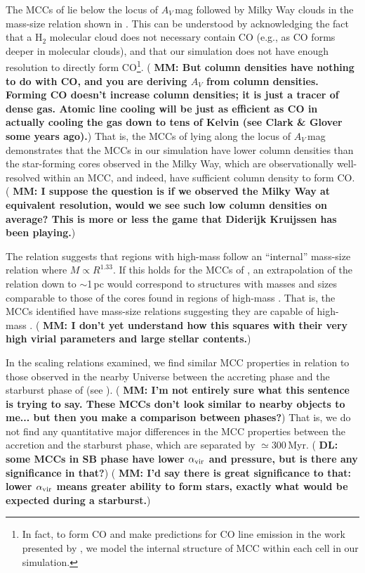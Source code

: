 \IfFileExists{emulateapjlegacy.cls}{\documentclass[iop]{emulateapjlegacy}}{\documentclass[iop]{emulateapj}}
\newcommand{\DL}[1]{({\bf \color{dlcolor} DL: #1})}
\newcommand{\MM}[1]{({\bf \color{mmcolor} MM: #1})}
\begin{document}
The MCCs of \flower lie below the locus of $A_V$\,mag followed
by Milky Way clouds in the mass-size relation shown in . This
can be understood by acknowledging the fact that a H$_2$ molecular
cloud does not necessary contain CO (e.g., as CO forms deeper in
molecular clouds), and that our simulation does not have enough
resolution to directly form CO\footnote{In fact, to form CO and make
  predictions for CO line emission in the work presented by
  \citet{Vallini18a}, we model the internal structure of MCC within
  each cell in our simulation.}.  
\MM{But column densities have nothing to do with CO, and you are
  deriving $A_V$ from column densities.  Forming CO doesn't increase
  column densities; it is just a tracer of dense gas.  Atomic line
  cooling will be just as efficient as CO in actually cooling the gas
  down to tens of Kelvin (see Clark \& Glover some years ago).}
%
That is, the MCCs of \flower lying along the locus of $A_V$\,mag 
    demonstrates
that the MCCs in our simulation have lower column densities than the
star-forming cores observed in the Milky Way, which are
observationally well-resolved within an MCC, and indeed, have
sufficient column density to form CO.  \MM{I suppose the question is
  if we observed the Milky Way at equivalent resolution, would we see
  such low column densities on average?  This is more or less the game
that Diderijk Kruijssen has been playing.}

The \citet{Kauffmann10c} relation suggests that regions with high-mass \SF follow 
an ``internal'' mass-size relation where $M\propto R^{1.33}$.
If this holds for the MCCs of \flower, an extrapolation of the \citet{Kauffmann10c} relation down to $\sim$1\,pc would correspond to structures with masses and sizes comparable to those of the cores found in
regions of high-mass \SF. That is, the MCCs identified have mass-size
relations suggesting they are capable of high-mass \SF. \MM{I don't
  yet understand how this squares with their very high virial
  parameters and large stellar contents.}

In the scaling relations examined, we find similar MCC properties in
relation to those observed in the nearby Universe between the
accreting phase and the starburst phase of \flower (see
). \MM{I'm not entirely sure what this sentence is
  trying to say.  These MCCs don't look similar to nearby objects to
  me... but then you make a comparison between phases?} That is, we do not find any quantitative major differences in the MCC properties between the accretion and the starburst phase, which are separated by $\simeq$300\,Myr. \DL{some MCCs in SB phase have
lower $\alpha_{\rm vir}$ and pressure, but 
is there any significance in that?} \MM{I'd say there is great
significance to that: lower $\alpha_{\rm vir}$ means greater ability to form
stars, exactly what would be expected during a starburst.}
\end{document}

